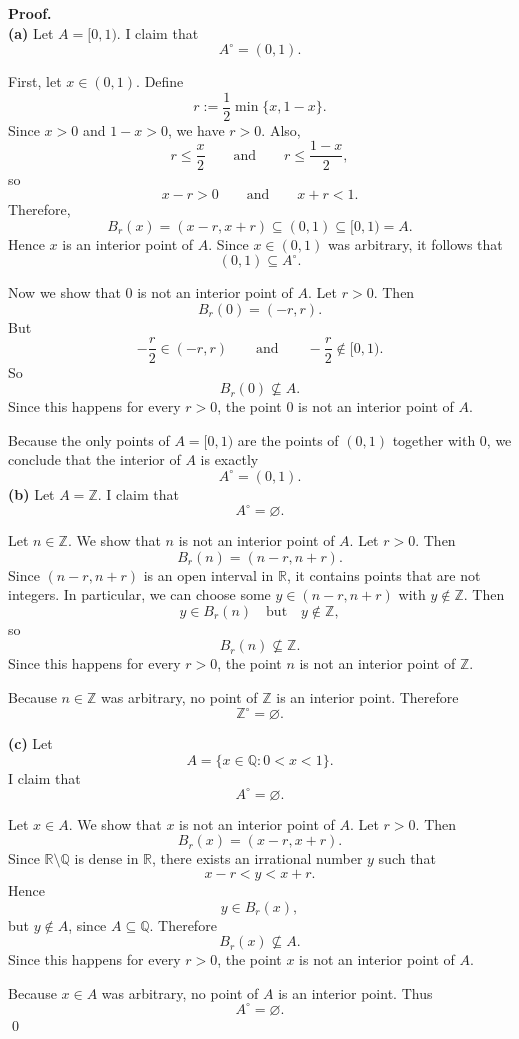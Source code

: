 \documentclass[12pt]{article}
\begin{document}
\textbf{Proof.}\\
\textbf{(a)} Let $A=[0,1)$. I claim that
\[
A^\circ=(0,1).
\]

First, let $x\in(0,1)$. Define
\[
r:=\frac12\min\{x,1-x\}.
\]
Since $x>0$ and $1-x>0$, we have $r>0$. Also,
\[
r\le \frac{x}{2}
\qquad\text{and}\qquad
r\le \frac{1-x}{2},
\]
so
\[
x-r>0
\qquad\text{and}\qquad
x+r<1.
\]
Therefore,
\[
B_r(x)=(x-r,x+r)\subseteq (0,1)\subseteq [0,1)=A.
\]
Hence $x$ is an interior point of $A$. Since $x\in(0,1)$ was arbitrary, it follows that
\[
(0,1)\subseteq A^\circ.
\]

Now we show that $0$ is not an interior point of $A$. Let $r>0$. Then
\[
B_r(0)=(-r,r).
\]
But
\[
-\frac{r}{2}\in (-r,r)
\qquad\text{and}\qquad
-\frac{r}{2}\notin [0,1).
\]
So
\[
B_r(0)\nsubseteq A.
\]
Since this happens for every $r>0$, the point $0$ is not an interior point of $A$.

Because the only points of $A=[0,1)$ are the points of $(0,1)$ together with $0$, we conclude that the interior of $A$ is exactly
\[
A^\circ=(0,1).
\]
 \textbf{(b)} Let $A=\mathbb{Z}$. I claim that
\[
A^\circ=\varnothing.
\]

Let $n\in\mathbb{Z}$. We show that $n$ is not an interior point of $A$. Let $r>0$. Then
\[
B_r(n)=(n-r,n+r).
\]
Since $(n-r,n+r)$ is an open interval in $\mathbb{R}$, it contains points that are not integers. In particular, we can choose some $y\in(n-r,n+r)$ with $y\notin\mathbb{Z}$. Then
\[
y\in B_r(n)\quad\text{but}\quad y\notin \mathbb{Z},
\]
so
\[
B_r(n)\nsubseteq \mathbb{Z}.
\]
Since this happens for every $r>0$, the point $n$ is not an interior point of $\mathbb{Z}$.

Because $n\in\mathbb{Z}$ was arbitrary, no point of $\mathbb{Z}$ is an interior point. Therefore
\[
\mathbb{Z}^\circ=\varnothing.
\]

\textbf{(c)} Let
\[
A=\{x\in\mathbb{Q}:0<x<1\}.
\]
I claim that
\[
A^\circ=\varnothing.
\]

Let $x\in A$. We show that $x$ is not an interior point of $A$. Let $r>0$. Then
\[
B_r(x)=(x-r,x+r).
\]
Since $\mathbb{R}\setminus\mathbb{Q}$ is dense in $\mathbb{R}$, there exists an irrational number $y$ such that
\[
x-r<y<x+r.
\]
Hence
\[
y\in B_r(x),
\]
but $y\notin A$, since $A\subseteq\mathbb{Q}$. Therefore
\[
B_r(x)\nsubseteq A.
\]
Since this happens for every $r>0$, the point $x$ is not an interior point of $A$.

Because $x\in A$ was arbitrary, no point of $A$ is an interior point. Thus
\[
A^\circ=\varnothing.
\]
\qed
 
\end{document}
